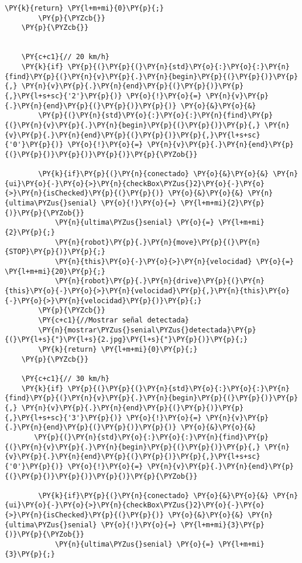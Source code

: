 \begin{Verbatim}[commandchars=\\\{\}]
            \PY{k}{return} \PY{l+m+mi}{0}\PY{p}{;}
        \PY{p}{\PYZcb{}}
    \PY{p}{\PYZcb{}}


    \PY{c+c1}{// 20 km/h}
    \PY{k}{if} \PY{p}{(}\PY{p}{(}\PY{n}{std}\PY{o}{:}\PY{o}{:}\PY{n}{find}\PY{p}{(}\PY{n}{v}\PY{p}{.}\PY{n}{begin}\PY{p}{(}\PY{p}{)}\PY{p}{,} \PY{n}{v}\PY{p}{.}\PY{n}{end}\PY{p}{(}\PY{p}{)}\PY{p}{,}\PY{l+s+sc}{'2'}\PY{p}{)} \PY{o}{!}\PY{o}{=} \PY{n}{v}\PY{p}{.}\PY{n}{end}\PY{p}{(}\PY{p}{)}\PY{p}{)} \PY{o}{&}\PY{o}{&} 
        \PY{p}{(}\PY{n}{std}\PY{o}{:}\PY{o}{:}\PY{n}{find}\PY{p}{(}\PY{n}{v}\PY{p}{.}\PY{n}{begin}\PY{p}{(}\PY{p}{)}\PY{p}{,} \PY{n}{v}\PY{p}{.}\PY{n}{end}\PY{p}{(}\PY{p}{)}\PY{p}{,}\PY{l+s+sc}{'0'}\PY{p}{)} \PY{o}{!}\PY{o}{=} \PY{n}{v}\PY{p}{.}\PY{n}{end}\PY{p}{(}\PY{p}{)}\PY{p}{)}\PY{p}{)}\PY{p}{\PYZob{}}

        \PY{k}{if}\PY{p}{(}\PY{n}{conectado} \PY{o}{&}\PY{o}{&} \PY{n}{ui}\PY{o}{-}\PY{o}{>}\PY{n}{checkBox\PYZus{}2}\PY{o}{-}\PY{o}{>}\PY{n}{isChecked}\PY{p}{(}\PY{p}{)} \PY{o}{&}\PY{o}{&} \PY{n}{ultima\PYZus{}senial} \PY{o}{!}\PY{o}{=} \PY{l+m+mi}{2}\PY{p}{)}\PY{p}{\PYZob{}}
            \PY{n}{ultima\PYZus{}senial} \PY{o}{=} \PY{l+m+mi}{2}\PY{p}{;}
            \PY{n}{robot}\PY{p}{.}\PY{n}{move}\PY{p}{(}\PY{n}{STOP}\PY{p}{)}\PY{p}{;}
            \PY{n}{this}\PY{o}{-}\PY{o}{>}\PY{n}{velocidad} \PY{o}{=} \PY{l+m+mi}{20}\PY{p}{;}
            \PY{n}{robot}\PY{p}{.}\PY{n}{drive}\PY{p}{(}\PY{n}{this}\PY{o}{-}\PY{o}{>}\PY{n}{velocidad}\PY{p}{,}\PY{n}{this}\PY{o}{-}\PY{o}{>}\PY{n}{velocidad}\PY{p}{)}\PY{p}{;}
        \PY{p}{\PYZcb{}}
        \PY{c+c1}{//Mostrar señal detectada}
        \PY{n}{mostrar\PYZus{}senial\PYZus{}detectada}\PY{p}{(}\PY{l+s}{"}\PY{l+s}{2.jpg}\PY{l+s}{"}\PY{p}{)}\PY{p}{;}
        \PY{k}{return} \PY{l+m+mi}{0}\PY{p}{;}
    \PY{p}{\PYZcb{}}

    \PY{c+c1}{// 30 km/h}
    \PY{k}{if} \PY{p}{(}\PY{p}{(}\PY{n}{std}\PY{o}{:}\PY{o}{:}\PY{n}{find}\PY{p}{(}\PY{n}{v}\PY{p}{.}\PY{n}{begin}\PY{p}{(}\PY{p}{)}\PY{p}{,} \PY{n}{v}\PY{p}{.}\PY{n}{end}\PY{p}{(}\PY{p}{)}\PY{p}{,}\PY{l+s+sc}{'3'}\PY{p}{)} \PY{o}{!}\PY{o}{=} \PY{n}{v}\PY{p}{.}\PY{n}{end}\PY{p}{(}\PY{p}{)}\PY{p}{)} \PY{o}{&}\PY{o}{&} 
       \PY{p}{(}\PY{n}{std}\PY{o}{:}\PY{o}{:}\PY{n}{find}\PY{p}{(}\PY{n}{v}\PY{p}{.}\PY{n}{begin}\PY{p}{(}\PY{p}{)}\PY{p}{,} \PY{n}{v}\PY{p}{.}\PY{n}{end}\PY{p}{(}\PY{p}{)}\PY{p}{,}\PY{l+s+sc}{'0'}\PY{p}{)} \PY{o}{!}\PY{o}{=} \PY{n}{v}\PY{p}{.}\PY{n}{end}\PY{p}{(}\PY{p}{)}\PY{p}{)}\PY{p}{)}\PY{p}{\PYZob{}}

        \PY{k}{if}\PY{p}{(}\PY{n}{conectado} \PY{o}{&}\PY{o}{&} \PY{n}{ui}\PY{o}{-}\PY{o}{>}\PY{n}{checkBox\PYZus{}2}\PY{o}{-}\PY{o}{>}\PY{n}{isChecked}\PY{p}{(}\PY{p}{)} \PY{o}{&}\PY{o}{&} \PY{n}{ultima\PYZus{}senial} \PY{o}{!}\PY{o}{=} \PY{l+m+mi}{3}\PY{p}{)}\PY{p}{\PYZob{}}
            \PY{n}{ultima\PYZus{}senial} \PY{o}{=} \PY{l+m+mi}{3}\PY{p}{;}


\end{Verbatim}
